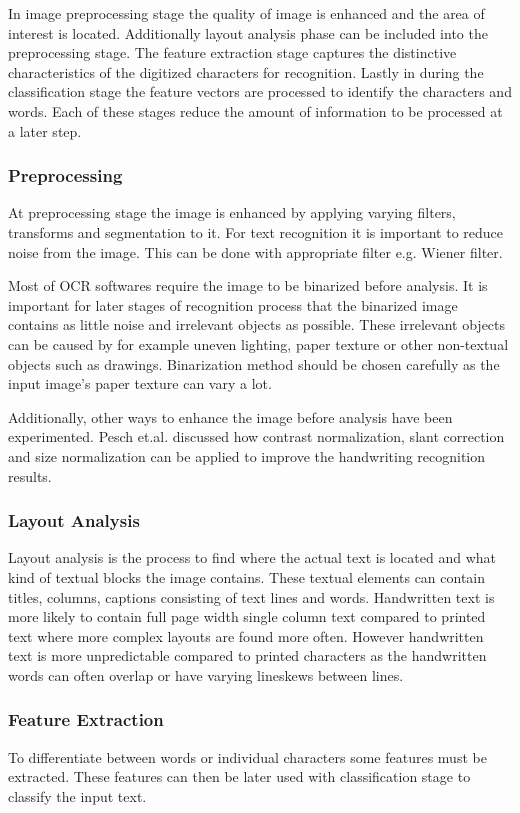 \documentclass{article}
\begin{document}
    In image preprocessing stage the quality of image is enhanced and the area of interest is located. Additionally layout analysis phase can be included into the preprocessing stage. The feature extraction stage captures the distinctive characteristics of the digitized characters for recognition. Lastly in during the classification stage the feature vectors are processed to identify the characters and words. Each of these stages reduce the amount of information to be processed at a later step. \cite{Cheriet2007}

      \subsubsection{Preprocessing}
        At preprocessing stage the image is enhanced by applying varying filters, transforms and segmentation to it. For text recognition it is important to reduce noise from the image. This can be done with appropriate filter e.g. Wiener filter.

        Most of OCR softwares require the image to be binarized before analysis. It is important for later stages of recognition process that the binarized image contains as little noise and irrelevant objects as possible.  These irrelevant objects can be caused by for example uneven lighting, paper texture or other non-textual objects such as drawings. Binarization method should be chosen carefully as the input image's paper texture can vary a lot.

        Additionally, other ways to enhance the image before analysis have been experimented. Pesch et.al. discussed how contrast normalization, slant correction and size normalization can be applied to improve the handwriting recognition results. \cite{Pesch2012}

      \subsubsection{Layout Analysis}
        Layout analysis is the process to find where the actual text is located and what kind of textual blocks the image contains. These textual elements can contain titles, columns, captions consisting of text lines and words. Handwritten text is more likely to contain full page width single column text compared to printed text where more complex layouts are found more often. However handwritten text is more unpredictable compared to printed characters as the handwritten words can often overlap or have varying lineskews between lines.
      \subsubsection{Feature Extraction}
        To differentiate between words or individual characters some features must be extracted. These features can then be later used with classification stage to classify the input text.
\end{document}
